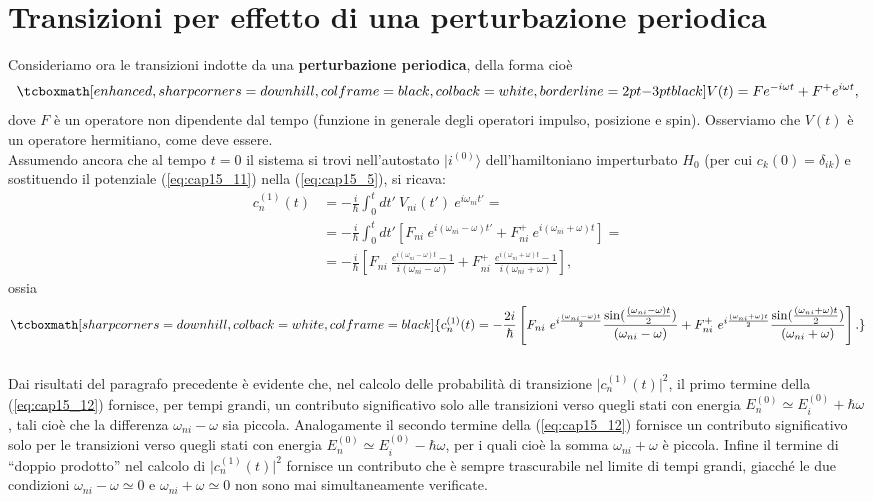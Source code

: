 \section{Transizioni per effetto di una perturbazione periodica}
Consideriamo ora le transizioni indotte da una \textbf{perturbazione periodica}, della forma cioè
	\begin{equation}
		\tcboxmath[enhanced, sharp corners=downhill, colframe=black, colback=white, borderline={2pt}{-3pt}{black}]{
			V(t) = Fe^{-i\omega t} + F^+ e ^{i\omega t},
			}
	\label{eq:cap15_11}
	\end{equation}
dove $F$ è un operatore non dipendente dal tempo (funzione in generale degli operatori impulso, posizione e spin). Osserviamo che $V(t)$ è un operatore hermitiano, come deve essere.	\\

Assumendo ancora che al tempo $t=0$ il sistema si trovi nell'autostato $\vert i ^{(0)}\rangle$ dell'hamiltoniano imperturbato $H_0$ (per cui $c_k (0) = \delta _{ik}$) e sostituendo il potenziale (\ref{eq:cap15_11}) nella (\ref{eq:cap15_5}), si ricava:
	\begin{align}
		c_n ^{(1)}(t) & =  -\frac{i}{\hbar}\int _0 ^t dt'\ V_{ni} (t') \ e^{i\omega _{ni}t'} = \nonumber \\
		&= -\frac{i}{\hbar}\int _0 ^t dt'\left[ F_{ni}\ e^{i(\omega _{ni}-\omega) t'} + F_{ni} ^+\ e ^{i(\omega _{ni} +\omega) t}\right] = \nonumber \\
		&= -\frac{i}{\hbar}\left[ F_{ni}\ \frac{e^{i(\omega _{ni}-\omega) t}-1}{i(\omega _{ni}-\omega)} + F_{ni} ^+\ \frac{e ^{i(\omega _{ni} +\omega) t}-1}{i(\omega _{ni}+\omega)}\right], 
	\end{align}
ossia
	\begin{equation}
		\tcboxmath[sharp corners=downhill, colback=white, colframe=black]{
			c_n ^{(1)}(t)= -\frac{2i}{\hbar}\left[ F_{ni}\ e^{i\frac{(\omega _{ni}-\omega) t}{2}}\frac{\sin(\frac{(\omega _{ni}-\omega) t}{2})}{(\omega _{ni}-\omega)}  + F_{ni} ^+\ e^{i\frac{(\omega _{ni}+\omega) t}{2}}\frac{\sin(\frac{(\omega _{ni}+\omega) t}{2})}{(\omega _{ni}+\omega)}\right].
			}
	\label{eq:cap15_12}
	\end{equation}\\
	
Dai risultati del paragrafo precedente è evidente che, nel calcolo delle probabilità di transizione $\vert c_n ^{(1)}(t)\vert ^2$, il primo termine della (\ref{eq:cap15_12}) fornisce, per tempi grandi, un contributo significativo solo alle transizioni verso quegli stati con energia $E_n ^{(0)} \simeq E_i ^{(0)}+ \hbar \omega $, tali cioè che la differenza  $\omega _{ni} - \omega$ sia piccola. Analogamente il secondo termine della (\ref{eq:cap15_12}) fornisce un contributo significativo solo per le transizioni verso quegli stati con energia  $E_n ^{(0)} \simeq E_i ^{(0)}- \hbar \omega $, per i quali cioè la somma $\omega _{ni} + \omega$ è piccola. Infine  il termine di ``doppio prodotto'' nel calcolo di  $\vert c_n ^{(1)}(t)\vert ^2$ fornisce un contributo che è sempre trascurabile nel limite di tempi grandi, giacché le due condizioni $\omega _{ni} - \omega\simeq 0$ e $\omega _{ni} + \omega\simeq 0$ non sono mai simultaneamente verificate.\\

